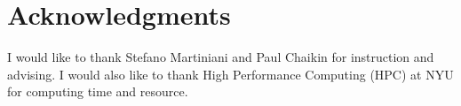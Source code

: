 \documentclass[a4paper]{article}
\begin{document}
\section*{Acknowledgments}

I would like to thank Stefano Martiniani and Paul Chaikin for instruction and advising. I would also like to thank High Performance Computing (HPC) at NYU for computing time and resource. 


\end{document}
